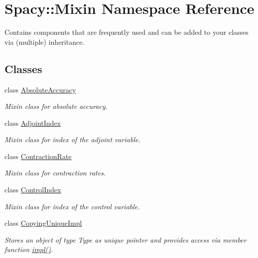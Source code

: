\hypertarget{namespaceSpacy_1_1Mixin}{}\section{Spacy\+:\+:Mixin Namespace Reference}
\label{namespaceSpacy_1_1Mixin}


Contains components that are frequently used and can be added to your classes via (multiple) inheritance.  


\subsection*{Classes}
\begin{DoxyCompactItemize}
\item 
class \hyperlink{classSpacy_1_1Mixin_1_1AbsoluteAccuracy}{Absolute\+Accuracy}
\begin{DoxyCompactList}\small\item\em Mixin class for absolute accuracy. \end{DoxyCompactList}\item 
class \hyperlink{classSpacy_1_1Mixin_1_1AdjointIndex}{Adjoint\+Index}
\begin{DoxyCompactList}\small\item\em Mixin class for index of the adjoint variable. \end{DoxyCompactList}\item 
class \hyperlink{classSpacy_1_1Mixin_1_1ContractionRate}{Contraction\+Rate}
\begin{DoxyCompactList}\small\item\em Mixin class for contraction rates. \end{DoxyCompactList}\item 
class \hyperlink{classSpacy_1_1Mixin_1_1ControlIndex}{Control\+Index}
\begin{DoxyCompactList}\small\item\em Mixin class for index of the control variable. \end{DoxyCompactList}\item 
class \hyperlink{classSpacy_1_1Mixin_1_1CopyingUniqueImpl}{Copying\+Unique\+Impl}
\begin{DoxyCompactList}\small\item\em Stores an object of type Type as unique pointer and provides access via member function \hyperlink{classSpacy_1_1Mixin_1_1CopyingUniqueImpl_ab7cc202fd000ba1753ef8596c09dc803}{impl()}. \end{DoxyCompactList}\item 

\end{DoxyCompactItemize}
